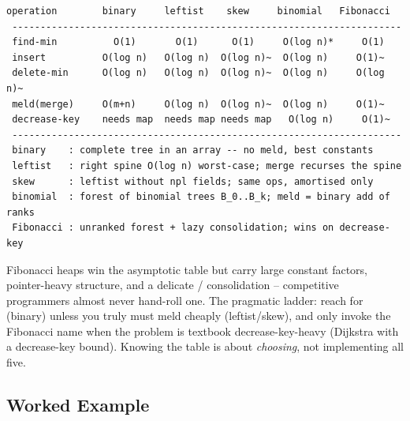 \begin{lstlisting}[caption={Operation costs across the heap family (n = current size; ~ = amortised; * = unless a min-pointer is kept)}, label={lst:c07-mergecost}]
 operation        binary     leftist    skew     binomial   Fibonacci
 ---------------------------------------------------------------------
 find-min          O(1)       O(1)      O(1)     O(log n)*     O(1)
 insert          O(log n)   O(log n)  O(log n)~  O(log n)     O(1)~
 delete-min      O(log n)   O(log n)  O(log n)~  O(log n)     O(log n)~
 meld(merge)     O(m+n)     O(log n)  O(log n)~  O(log n)     O(1)~
 decrease-key    needs map  needs map needs map   O(log n)     O(1)~
 ---------------------------------------------------------------------
 binary    : complete tree in an array -- no meld, best constants
 leftist   : right spine O(log n) worst-case; merge recurses the spine
 skew      : leftist without npl fields; same ops, amortised only
 binomial  : forest of binomial trees B_0..B_k; meld = binary add of ranks
 Fibonacci : unranked forest + lazy consolidation; wins on decrease-key
\end{lstlisting}

\begin{notebox}
Fibonacci heaps win the asymptotic table but carry large constant factors, pointer-heavy structure, and a
delicate /{} consolidation -- competitive programmers almost never hand-roll
one. The pragmatic ladder: reach for  (binary) unless you truly must meld cheaply
(leftist/skew), and only invoke the Fibonacci name when the problem is textbook decrease-key-heavy (Dijkstra
with a decrease-key bound). Knowing the table is about \emph{choosing}, not implementing all five.
\end{notebox}

\subsection{Worked Example}

